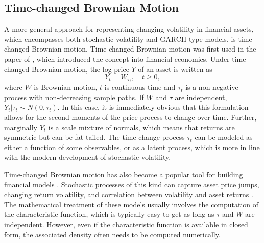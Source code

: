 	\subsection{ Time-changed Brownian Motion}
	A more general approach for representing changing volatility in financial assets, which encompasses both stochastic volatility and GARCH-type models, is time-changed Brownian motion. Time-changed Brownian motion was first used in the paper of \cite{clark1973subordinated}, which introduced the concept into financial economics. Under time-changed Brownian motion, the log-price $Y$ of an asset is written as 
	\begin{equation}
		Y_t = W_{\tau_t}, \quad t \geq 0,
	\end{equation}
	where $W$ is Brownian motion, $t$ is continuous time and $\tau_t$ is a non-negative process with non-decreasing sample paths. If $W$ and $\tau$ are independent, $Y_t | \tau_t \sim N(0, \tau_t)$. In this case, it is immediately obvious that this formulation allows for the second moments of the price process to change over time. Further, marginally $Y_t$ is a scale mixture of normals, which means that returns are symmetric but can be fat tailed. The time-change process $\tau_t$ can be modeled as either a function of some observables, or as a latent process, which is more in line with the modern development of stochastic volatility. 

Time-changed Brownian motion has also become a popular tool for building financial models \citep*{geman2005measure}. Stochastic processes of this kind can capture asset price jumps, changing return volatility, and correlation between volatility and asset returns \citep*{carr2004time}. The mathematical treatment of these models usually involves the computation of the characteristic function, which is typically easy to get as long as $\tau$ and $W$ are independent. However, even if the characteristic function is available in closed form, the associated density often needs to be computed numerically.


